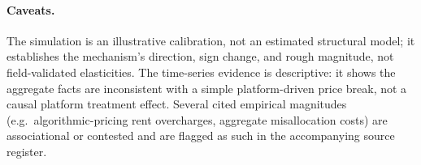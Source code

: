 \documentclass[11pt]{article}
\begin{document}
\paragraph{Caveats.}
The simulation is an illustrative calibration, not an estimated structural model; it establishes the
mechanism's direction, sign change, and rough magnitude, not field-validated elasticities. The
time-series evidence is descriptive: it shows the aggregate facts are inconsistent with a simple
platform-driven price break, not a causal platform treatment effect. Several cited empirical
magnitudes (e.g.\ algorithmic-pricing rent overcharges, aggregate misallocation costs) are
associational or contested and are flagged as such in the accompanying source register.


\end{document}
